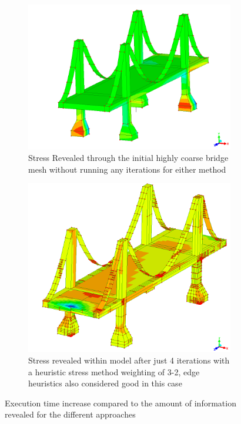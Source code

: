 \begin{figure}[h!]
\centering
\begin{subfigure}{.5\textwidth}
  \centering
  \includegraphics[width=0.9\linewidth]{../Graphics/BridgeCrossLoadingStress/bridgeStressBasic.png}
  \caption{Stress Revealed through the initial highly coarse bridge mesh without running any iterations for either method}
  \label{fig:sub1}
\end{subfigure}%
\begin{subfigure}{.5\textwidth}
  \centering
  \includegraphics[width=0.9\linewidth]{../Graphics/BridgeCrossLoadingStress/Hybrid-best-3-2.png}
  \caption{Stress revealed within model after just 4 iterations with a heuristic stress method weighting of 3-2, edge heuristics also considered good in this case}
  \label{fig:sub2}
\end{subfigure}
\label{fig:test}
  \caption{Execution time increase compared to the amount of information revealed for the different approaches}
 \end{figure}


